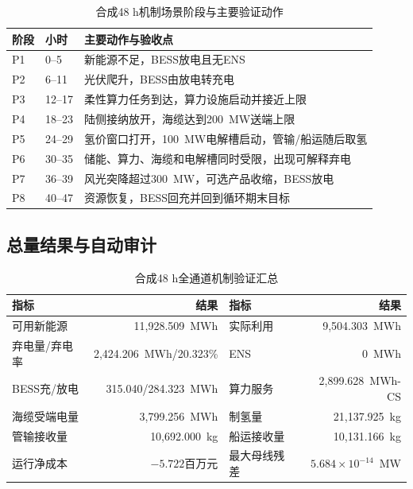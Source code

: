 \begin{table}[htbp]
\centering
\caption{合成48 h机制场景阶段与主要验证动作}
\label{tab:c5-mechanism-phases}
\begin{tabularx}{\textwidth}{p{1.3cm}p{2.2cm}X}
\toprule
阶段 & 小时 & 主要动作与验收点\\
\midrule
P1 & 0--5 & 新能源不足，BESS放电且无ENS\\
P2 & 6--11 & 光伏爬升，BESS由放电转充电\\
P3 & 12--17 & 柔性算力任务到达，算力设施启动并接近上限\\
P4 & 18--23 & 陆侧接纳放开，海缆达到200~MW送端上限\\
P5 & 24--29 & 氢价窗口打开，100~MW电解槽启动，管输/船运随后取氢\\
P6 & 30--35 & 储能、算力、海缆和电解槽同时受限，出现可解释弃电\\
P7 & 36--39 & 风光突降超过300~MW，可选产品收缩，BESS放电\\
P8 & 40--47 & 资源恢复，BESS回充并回到循环期末目标\\
\bottomrule
\end{tabularx}
\end{table}

\subsection{总量结果与自动审计}

\begin{table}[htbp]
\centering
\caption{合成48 h全通道机制验证汇总}
\label{tab:c5-mechanism-summary}
\begin{tabular}{lrlr}
\toprule
指标 & 结果 & 指标 & 结果\\
\midrule
可用新能源 & 11,928.509~MWh & 实际利用 & 9,504.303~MWh\\
弃电量/弃电率 & 2,424.206~MWh/20.323\% & ENS & 0~MWh\\
BESS充/放电 & 315.040/284.323~MWh & 算力服务 & 2,899.628~MWh-CS\\
海缆受端电量 & 3,799.256~MWh & 制氢量 & 21,137.925~kg\\
管输接收量 & 10,692.000~kg & 船运接收量 & 10,131.166~kg\\
运行净成本 & $-5.722$百万元 & 最大母线残差 & $5.684\times10^{-14}$~MW\\
\bottomrule
\end{tabular}
\end{table}

